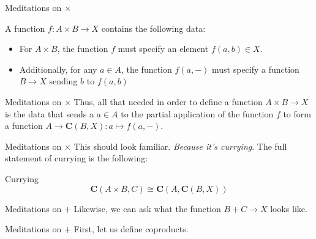 \documentclass[tikz]{beamer}
\theoremstyle{definition}
\begin{document}
\begin{frame}{Meditations on $\times$}

    A function $f: A \times B \to X$ contains the following data: 
    \begin{block}{}
    
        \begin{itemize}
            \item For $A \times B$, the function $f$ must specify an element $f(a,b) \in X$.
            
            \item Additionally, for any $a \in A$, the function $f(a,-)$ must specify a function $B \to X$ sending $b$ to $f(a,b)$
        \end{itemize}{}
    \end{block}{}
\end{frame}{}

\begin{frame}{Meditations on $\times$}
    Thus, all that needed in order to define a function $A \times B \to X$ is the data that sends a $a \in A$ to the partial application of the function $f$ to form a function $A \to \mathbf{C}(B, X): a \mapsto f(a,-)$. 
\end{frame}{}

\begin{frame}{Meditations on $\times$}
    This should look familiar. \textit{Because it's currying}. The full statement of currying is the following:
    
\begin{block}{Currying}
\begin{equation*}
    \mathbf{C}(A \times B, C) \cong \mathbf{C}(A, \mathbf{C}(B, X))
\end{equation*}{}
\end{block}{}
    
\end{frame}{}

\begin{frame}{Meditations on $+$}
    Likewise, we can ask what the function $B + C \to X$ looks like. 
\end{frame}{}

\begin{frame}{Meditations on $+$}
    First, let us define coproducts. 
\end{frame}{}
\end{document}
